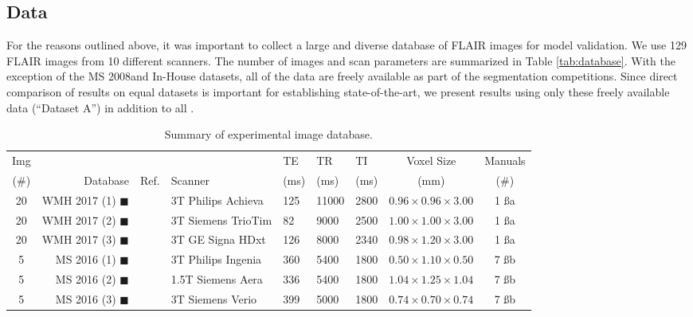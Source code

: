 \subsection{Data}\label{ss:data}
For the reasons outlined above, it was important to collect a large and diverse database of FLAIR images for model validation. We use 129 FLAIR images from 10 different scanners. The number of images and scan parameters are summarized in Table \ref{tab:database}. With the exception of the MS 2008\footnotemark and In-House datasets, all of the data are freely available as part of the segmentation competitions. Since direct comparison of results on equal datasets is important for establishing state-of-the-art, we present results using only these freely available data (``Dataset A'') in addition to all .
\begin{table}[t]
  \centering
  \caption{Summary of experimental image database.}
  {\setlength{\tabcolsep}{4pt}
    \begin{tabu} to \textwidth {crclX[c]X[c]X[c]cc}
      \hline
      Img  &                                          &                   &                    & TE   & TR    & TI   &         Voxel Size         & Manuals  \\
      (\#) &                                 Database &       Ref.        & Scanner            & (ms) & (ms)  & (ms) &            (mm)            &   (\#)   \\   & WMH 2017 (1) {\color{c01}$\blacksquare$} & \cite{WMHSEG2017} & 3T Philips Achieva & 125  & 11000 & 2800 & $0.96\times0.96\times3.00$ & 1 \ss{a} \\
       20  & WMH 2017 (2) {\color{c02}$\blacksquare$} & \cite{WMHSEG2017} & 3T Siemens TrioTim & 82   & 9000  & 2500 & $1.00\times1.00\times3.00$ & 1 \ss{a} \\
       20  & WMH 2017 (3) {\color{c03}$\blacksquare$} & \cite{WMHSEG2017} & 3T GE Signa HDxt   & 126  & 8000  & 2340 & $0.98\times1.20\times3.00$ & 1 \ss{a} \\
       5   & MS 2016  (1) {\color{c04}$\blacksquare$} & \cite{MSSEG2016}  & 3T Philips Ingenia & 360  & 5400  & 1800 & $0.50\times1.10\times0.50$ & 7 \ss{b} \\
       5   & MS 2016  (2) {\color{c05}$\blacksquare$} & \cite{MSSEG2016}  & 1.5T Siemens Aera  & 336  & 5400  & 1800 & $1.04\times1.25\times1.04$ & 7 \ss{b} \\
       5   & MS 2016  (3) {\color{c06}$\blacksquare$} & \cite{MSSEG2016}  & 3T Siemens Verio   & 399  & 5000  & 1800 & $0.74\times0.70\times0.74$ & 7 \ss{b} \\

\end{tabu}}
\end{table}

